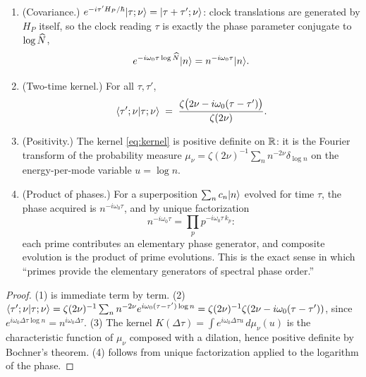 \begin{proposition}\label{prop:kernel}
\begin{enumerate}[leftmargin=1.6em]
\item (Covariance.) $e^{-i\tau' H_{P}/\hbar}\lvert \tau;\nu\rangle=\lvert \tau+\tau';\nu\rangle$: clock
translations are generated by $H_{P}$ itself, so the clock reading $\tau$ is exactly the
phase parameter conjugate to $\log\widehat{N}$,
\begin{equation}
e^{-i\omega_{0}\tau\log\widehat{N}}\lvert n\rangle=n^{-i\omega_{0}\tau}\lvert n\rangle.
\end{equation}
\item (Two-time kernel.) For all $\tau,\tau'$,
\begin{equation}\label{eq:kernel}
\langle \tau';\nu\rvert \tau;\nu\rangle
\;=\;\frac{\zeta\bigl(2\nu-i\omega_{0}(\tau-\tau')\bigr)}{\zeta(2\nu)}.
\end{equation}
\item (Positivity.) The kernel \eqref{eq:kernel} is positive definite on $\mathbb{R}$: it is the
Fourier transform of the probability measure
$\mu_{\nu}=\zeta(2\nu)^{-1}\sum_{n}n^{-2\nu}\delta_{\log n}$ on the energy-per-mode
variable $u=\log n$.
\item (Product of phases.) For a superposition $\sum_{n}c_{n}\lvert n\rangle$ evolved for time
$\tau$, the phase acquired is $n^{-i\omega_{0}\tau}$, and by unique factorization
\begin{equation}
n^{-i\omega_{0}\tau}=\prod_{p}p^{-i\omega_{0}\tau\,k_{p}}:
\end{equation}
each prime contributes an elementary phase generator, and composite evolution is the product
of prime evolutions. This is the exact sense in which ``primes provide the elementary
generators of spectral phase order.''
\end{enumerate}
\end{proposition}

\begin{proof}
(1) is immediate term by term. (2) $\langle \tau';\nu\rvert \tau;\nu\rangle
=\zeta(2\nu)^{-1}\sum_{n}n^{-2\nu}e^{i\omega_{0}(\tau-\tau')\log n}
=\zeta(2\nu)^{-1}\zeta(2\nu-i\omega_{0}(\tau-\tau'))$, since
$e^{i\omega_{0}\Delta\tau\log n}=n^{i\omega_{0}\Delta\tau}$. (3) The kernel
$K(\Delta\tau)=\int e^{i\omega_{0}\Delta\tau u}\,d\mu_{\nu}(u)$ is the characteristic
function of $\mu_{\nu}$ composed with a dilation, hence positive definite by Bochner's
theorem. (4) follows from unique factorization applied to the logarithm of the phase.
\end{proof}

